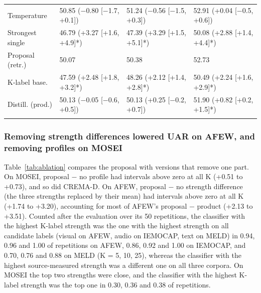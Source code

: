 \begin{table}[!htbp]
\begin{tabular}{@{}llll@{}}
Temperature & 50.85 ($-$0.80 [$-$1.7, +0.1]) & 51.24 ($-$0.56 [$-$1.5, +0.3]) & 52.91 (+0.04 [$-$0.5, +0.6]) \\
Strongest single & 46.79 (+3.27 [+1.6, +4.9]*) & 47.39 (+3.29 [+1.5, +5.1]*) & 50.08 (+2.88 [+1.4, +4.4]*) \\
Proposal (retr.) & 50.07 & 50.38 & 52.73 \\
K-label base. & 47.59 (+2.48 [+1.8, +3.2]*) & 48.26 (+2.12 [+1.4, +2.8]*) & 50.49 (+2.24 [+1.6, +2.9]*) \\
Distill. (prod.) & 50.13 ($-$0.05 [$-$0.6, +0.5]) & 50.13 (+0.25 [$-$0.2, +0.7]) & 51.90 (+0.82 [+0.2, +1.5]*) \\
\botrule\end{tabular}
\end{table}


\subsubsection{Removing strength differences lowered UAR on AFEW, and removing profiles on MOSEI}
Table~\ref{tab:ablation} compares the proposal with versions that remove one part. On MOSEI, proposal $-$ no profile had intervals above zero at all K (+0.51 to +0.73\pt), and so did CREMA-D. On AFEW, proposal $-$ no strength difference (the three strengths replaced by their mean) had intervals above zero at all K (+1.74 to +3.20\pt), accounting for most of AFEW's proposal $-$ product (+2.13 to +3.51\pt). Counted after the evaluation over its 50 repetitions, the classifier with the highest K-label strength was the one with the highest strength on all candidate labels (visual on AFEW, audio on IEMOCAP, text on MELD) in 0.94, 0.96 and 1.00 of repetitions on AFEW, 0.86, 0.92 and 1.00 on IEMOCAP, and 0.70, 0.76 and 0.88 on MELD (K = 5, 10, 25), whereas the classifier with the highest source-measured strength was a different one on all three corpora. On MOSEI the top two strengths were close, and the classifier with the highest K-label strength was the top one in 0.30, 0.36 and 0.38 of repetitions.

